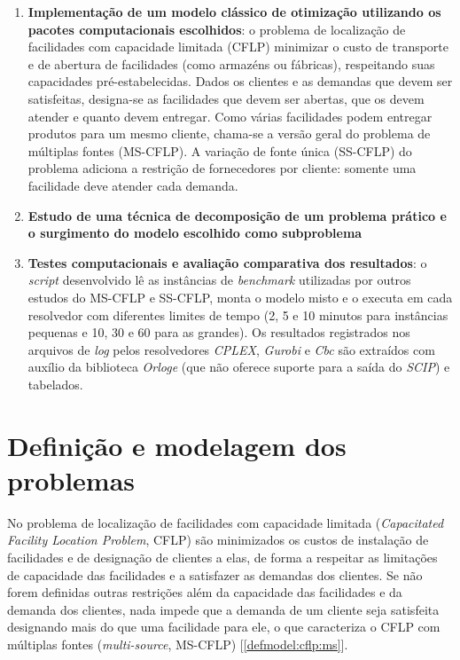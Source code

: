 \documentclass[]{article}
\newcommand{ \solver }[1]{\textit{#1}}
\newcommand{ \python }[1]{\textit{#1}}
\newif\ifartigo
\begin{document}
\begin{enumerate}
			\item \textbf{Implementação de um modelo clássico de otimização utilizando os pacotes computacionais escolhidos}:
				o problema de localização de facilidades com capacidade limitada (CFLP) minimizar o custo de transporte e de abertura de facilidades (como armazéns ou fábricas), respeitando suas capacidades pré-estabelecidas. 
				Dados os clientes e as demandas que devem ser satisfeitas, designa-se as facilidades que devem ser abertas, que os devem atender e quanto devem entregar.  
				Como várias facilidades podem entregar produtos para um mesmo cliente, chama-se a versão geral do problema de múltiplas fontes (MS-CFLP).
				A variação de fonte única (SS-CFLP) do problema adiciona a restrição de fornecedores por cliente: somente uma facilidade deve atender cada demanda.
			
			\item \textbf{Estudo de uma técnica de decomposição de um problema prático e o surgimento do modelo escolhido como subproblema} %
			
			\item \textbf{Testes computacionais e avaliação comparativa dos resultados}:
				o \textit{script} desenvolvido lê as instâncias de \textit{benchmark} utilizadas por outros estudos do MS-CFLP e SS-CFLP, monta o modelo misto e o executa em cada resolvedor com diferentes limites de tempo (2, 5 e 10 minutos para instâncias pequenas e 10, 30 e 60 para as grandes).    
				Os resultados registrados nos arquivos de \textit{log} pelos resolvedores \solver{CPLEX}, \solver{Gurobi} e \solver{Cbc} são extraídos com auxílio da biblioteca \python{Orloge} \cite{orloge} (que não oferece suporte para a saída do \solver{SCIP}) e tabelados.  
				
		\end{enumerate}
\fi	

\ifartigo
	\section{Revisão da literatura}
	
\fi		

\ifartigo	
	\section{Definição e modelagem dos problemas} \label{defmodel:cflp}
	
		No problema de localização de facilidades com capacidade limitada (\textit{Capacitated Facility Location Problem}, CFLP) são minimizados os custos de instalação de facilidades e de designação de clientes a elas, de forma a respeitar as limitações de capacidade das facilidades e a satisfazer as demandas dos clientes.      
		Se não forem definidas outras restrições além da capacidade das facilidades e da demanda dos clientes, nada impede que a demanda de um cliente seja satisfeita designando mais do que uma facilidade para ele, o que caracteriza o CFLP com múltiplas fontes (\textit{multi-source}, MS-CFLP) [\ref{defmodel:cflp:ms}].  
		
\end{document}
